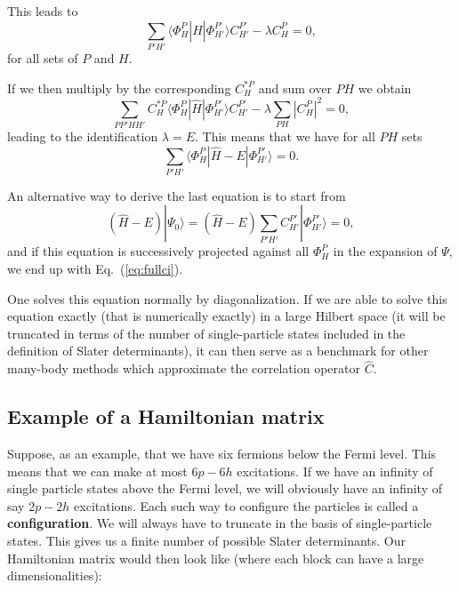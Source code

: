 \documentclass[%
twoside,                 %
final,                   %
10pt]{article}
\begin{document}
This leads to 
\[
\sum_{P'H'}\langle \Phi_H^P | \hat{H} |\Phi_{H'}^{P'} \rangle C_{H'}^{P'}-\lambda C_H^{P}=0,
\]
for all sets of $P$ and $H$.

If we then multiply by the corresponding $C_H^{*P}$ and sum over $PH$ we obtain
\[ 
\sum_{PP'HH'}C_H^{*P}\langle \Phi_H^P | \hat{H} |\Phi_{H'}^{P'} \rangle C_{H'}^{P'}-\lambda\sum_{PH}|C_H^P|^2=0,
\]
leading to the identification $\lambda = E$. This means that we have for all $PH$ sets
\begin{equation}
\sum_{P'H'}\langle \Phi_H^P | \hat{H} -E|\Phi_{H'}^{P'} \rangle = 0. \label{eq:fullci}
\end{equation}



An alternative way to derive the last equation is to start from 
\[
(\hat{H} -E)|\Psi_0\rangle = (\hat{H} -E)\sum_{P'H'}C_{H'}^{P'}|\Phi_{H'}^{P'} \rangle=0, 
\]
and if this equation is successively projected against all $\Phi_H^P$ in the expansion of $\Psi$, we end up with Eq.~(\ref{eq:fullci}).

One solves this equation normally by diagonalization. If we are able to solve this equation exactly (that is
numerically exactly) in a large Hilbert space (it will be truncated in terms of the number of single-particle states included in the definition
of Slater determinants), it can then serve as a benchmark for other many-body methods which approximate the correlation operator
$\hat{C}$.  


\subsection*{Example of a Hamiltonian matrix}

Suppose, as an example, that we have six fermions below the Fermi level.
This means that we can make at most $6p-6h$ excitations. If we have an infinity of single particle states above the Fermi level, we will obviously have an infinity of say $2p-2h$ excitations. Each such way to configure the particles is called a \textbf{configuration}. We will always have to truncate in the basis of single-particle states.
This gives us a finite number of possible Slater determinants. Our Hamiltonian matrix would then look like (where each block can have a large dimensionalities):
\end{document}
